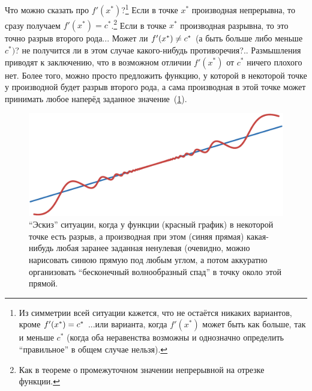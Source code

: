 \documentclass[a4paper,12pt]{article}
\begin{document}
  Что можно сказать про $f'(x^*)$?\footnote{
    Из симметрии всей ситуации кажется, что не остаётся никаких вариантов, кроме $f'(x^*) \hm= c^*$ ...или варианта, когда $f'(x^*)$ может быть как больше, так и меньше $c^*$ (когда оба неравенства возможны и однозначно определить ``правильное'' в общем случае нельзя).
  }
  Если в точке $x^*$ производная непрерывна, то сразу получаем $f'(x^*) = c^*$.\footnote{
    Как в теореме о промежуточном значении непрерывной на отрезке функции.
  }
  Если в точке $x^*$ производная разрывна, то это точно разрыв второго рода...
  Может ли $f'(x^*) \hm{\not=} c^*$ (а быть больше либо меньше $c^*)$? не получится ли в этом случае какого-нибудь противоречия?..
  Размышления приводят к заключению, что в возможном отличии $f'(x^*)$ от $c^*$ ничего плохого нет.
  Более того, можно просто предложить функцию, у которой в некоторой точке у производной будет разрыв второго рода, а сама производная в этой точке может принимать любое наперёд заданное значение~(\ref{fig:any-diff-at-break}).
  

  \begin{figure}[ht]
      \centering
      
      \includegraphics[width=0.8\linewidth]{images/func-with-any-diff-at-break3}
      
      \caption{``Эскиз'' ситуации, когда у функции (красный график) в некоторой точке есть разрыв, а производная при этом (синяя прямая) какая-нибудь любая заранее заданная ненулевая (очевидно, можно нарисовать синюю прямую под любым углом, а потом аккуратно организовать ``бесконечный волнообразный спад'' в точку около этой прямой.}
      \label{fig:any-diff-at-break}
  \end{figure}
\end{document}

